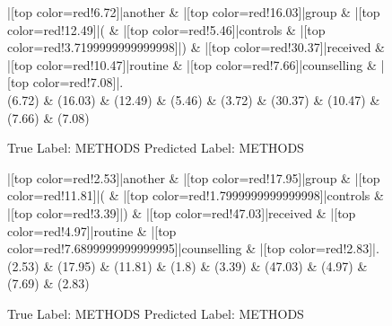 \documentclass[a4paper, landscape]{article}
\begin{document}
\begin{figure}
\begin{center}
\begin{dependency}
\begin{deptext}
|[top color=red!6.72]|another \& |[top color=red!16.03]|group \& |[top color=red!12.49]|( \& |[top color=red!5.46]|controls \& |[top color=red!3.7199999999999998]|) \& |[top color=red!30.37]|received \& |[top color=red!10.47]|routine \& |[top color=red!7.66]|counselling \& |[top color=red!7.08]|.\\
(6.72) \& (16.03) \& (12.49) \& (5.46) \& (3.72) \& (30.37) \& (10.47) \& (7.66) \& (7.08)\\
\end{deptext}
\end{dependency}
\end{center}
\caption{True Label: METHODS Predicted Label: METHODS}
\end{figure}
\clearpage
\begin{figure}
\begin{center}
\begin{dependency}
\begin{deptext}
|[top color=red!2.53]|another \& |[top color=red!17.95]|group \& |[top color=red!11.81]|( \& |[top color=red!1.7999999999999998]|controls \& |[top color=red!3.39]|) \& |[top color=red!47.03]|received \& |[top color=red!4.97]|routine \& |[top color=red!7.6899999999999995]|counselling \& |[top color=red!2.83]|.\\
(2.53) \& (17.95) \& (11.81) \& (1.8) \& (3.39) \& (47.03) \& (4.97) \& (7.69) \& (2.83)\\
\end{deptext}
\end{dependency}
\end{center}
\caption{True Label: METHODS Predicted Label: METHODS}
\end{figure}
\end{document}
